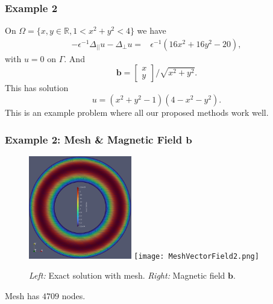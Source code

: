 \documentclass{beamer}
\begin{document}
    \begin{frame}
        \frametitle{Example 2}
        On $\Omega=\{x,y \in \mathbb{R}, 1 < x^2+y^2 < 4\}$ we have 
\begin{align*}
                -\epsilon^{-1}\Delta_{||}u-\Delta_{\bot}u=& \epsilon^{-1}(16x^2+16y^2 - 20),
 \end{align*}
 with $u = 0$ on $\Gamma$. And
 \begin{equation*}
 \mathbf{b} = \left[
 \begin{matrix}
 x \\
 y 
 \end{matrix}
 \right]/\sqrt{x^2+y^2}.
 \end{equation*}
 This has solution
 \begin{equation*}
 u = (x^2+y^2-1)(4-x^2-y^2).
 \end{equation*}
    This is an example problem where all our proposed methods work well.
    \end{frame}
    \begin{frame}
        \frametitle{Example 2: Mesh \& Magnetic Field $\mathbf{b}$}
\begin{figure}
            \centering
            \includegraphics[width=0.4\textwidth]{Exact_Solution_Mesh.png} 
            \qquad
            \texttt{[image: MeshVectorField2.png]} 
            \label{fig:example}
            \caption{{\it Left:} Exact solution with mesh. {\it Right:} Magnetic field $\mathbf{b}$.}
        \end{figure}
Mesh has $4709$ nodes.
\end{frame}
\end{document}

